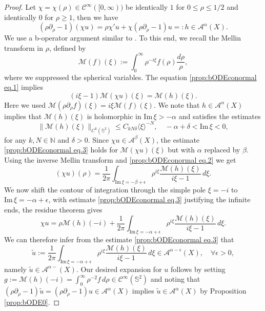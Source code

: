 \documentclass[10pt,a4paper,reqno]{amsart}
\renewcommand{\Im}{\operatorname{Im}}
\newcommand{\CI}{\mathcal{C}^\infty}
\newcommand{\NN}{\mathbb{N}}
\newcommand{\A}{\mathcal{A}}
\newcommand{\pa}{\partial}
\renewcommand{\S}{{\mathbb S}}
\theoremstyle{definition}
\theoremstyle{remark}
\numberwithin{equation}{section}
\renewcommand{\Im}{\mathrm{Im}\,}
\newcommand{\calM}{\mathcal M}
\begin{document}
\begin{proof}
Let $\chi=\chi(\rho)\in \CI([0,\infty))$ be identically $1$ for $0\leq \rho\leq 1/2$ and identically $0$ for $\rho\geq 1$, then we have
\begin{equation}
\label{prop:bODEconormal eq.1}
    (\rho\pa_\rho - 1)(\chi u) = \rho\chi' u + \chi (\rho\pa_\rho - 1)u =: h \in \A^{\alpha}(X).
\end{equation}
We use a b-operator argument similar to \cite[Lemma 2.23]{Hin22}. To this end, we recall the Mellin transform in $\rho$, defined by
\[
    \calM(f)(\xi):= \int_0^\infty \rho^{-i\xi} f(\rho) \frac{d\rho}{\rho},
\]
where we suppressed the spherical variables. The equation \eqref{prop:bODEconormal eq.1} implies
\begin{equation}
\label{prop:bODEconormal eq.2}
    (i\xi - 1)\calM(\chi u)(\xi) = \calM(h)(\xi).
\end{equation}
Here we used $\calM(\rho\pa_\rho f)(\xi) = i\xi \calM(f)(\xi)$. We note that $h \in\A^{\alpha}(X)$ implies that $\calM(h)(\xi)$ is holomorphic in $\Im\xi > -\alpha$ and satisfies the estimates
\begin{equation}
\label{prop:bODEconormal eq.3}
    \|\calM(h)(\xi)\|_{C^k(\S^2)} \leq C_{kN\delta}\langle\xi\rangle^{-N},\quad -\alpha+\delta<\Im\xi<0,
\end{equation}
for any $k, N\in\NN$ and $\delta>0$. Since $\chi u\in\A^{\beta}(X)$, the estimate \eqref{prop:bODEconormal eq.3} holds for $\calM(\chi u)(\xi)$ but with $\alpha$ replaced by $\beta$. Using the inverse Mellin transform and \eqref{prop:bODEconormal eq.2} we get
\[
    (\chi u) (\rho) = \frac{1}{2\pi}\int_{\Im\xi = -\beta+\epsilon} \rho^{i\xi} \frac{\calM(h)(\xi)}{i\xi - 1}\,d\xi.
\]
We now shift the contour of integration through the simple pole $\xi=-i$ to $\Im\xi=-\alpha+\epsilon$, with estimate \eqref{prop:bODEconormal eq.3} justifying the infinite ends, the residue theorem gives 
\[
    \chi u = \rho \calM(h)(-i) + \frac{1}{2\pi}\int_{\Im\xi = -\alpha+\epsilon} \rho^{i\xi} \frac{\calM(h)(\xi)}{i\xi - 1}\,d\xi .
\]
We can therefore infer from the estimate \eqref{prop:bODEconormal eq.3} that
\[
    \widetilde{u} := \frac{1}{2\pi}\int_{\Im\xi = -\alpha+\epsilon} \rho^{i\xi} \frac{\calM(h)(\xi)}{i\xi - 1}\,d\xi \in \A^{\alpha-\epsilon}(X),\quad\forall\epsilon>0 ,
\]
namely $\widetilde{u}\in\A^{\alpha-}(X)$. Our desired expansion for $u$ follows by setting $g:=\calM(h)(-i) = \int_0^\infty \rho^{-2}f\,d\rho \in\CI(\S^2)$ and noting that $(\rho\pa_\rho - 1)\widetilde{u} = (\rho\pa_\rho - 1)u\in \A^\alpha(X)$ implies $\widetilde{u}\in \A^\alpha(X)$ by Proposition \ref{prop:bODE0}.
\end{proof}
\end{document}
